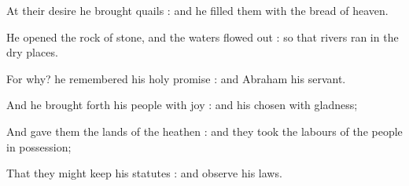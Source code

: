 At their desire he brought quails : and he filled them with the bread of heaven.\par
{}He opened the rock of stone, and the waters flowed out : so that rivers ran in the dry places.\par
{}For why? he remembered his holy promise : and Abraham his servant.\par
{}And he brought forth his people with joy : and his chosen with gladness;\par
{}And gave them the lands of the heathen : and they took the labours of the people in possession;\par
{}That they might keep his statutes : and observe his laws.\par



